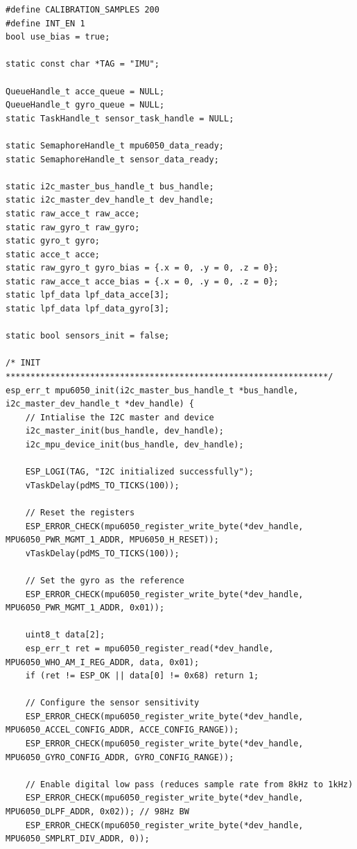 \begin{lstlisting}
#define CALIBRATION_SAMPLES 200
#define INT_EN 1
bool use_bias = true;

static const char *TAG = "IMU";

QueueHandle_t acce_queue = NULL;
QueueHandle_t gyro_queue = NULL;
static TaskHandle_t sensor_task_handle = NULL;

static SemaphoreHandle_t mpu6050_data_ready;
static SemaphoreHandle_t sensor_data_ready;

static i2c_master_bus_handle_t bus_handle;
static i2c_master_dev_handle_t dev_handle;
static raw_acce_t raw_acce; 
static raw_gyro_t raw_gyro;
static gyro_t gyro;
static acce_t acce;
static raw_gyro_t gyro_bias = {.x = 0, .y = 0, .z = 0};
static raw_acce_t acce_bias = {.x = 0, .y = 0, .z = 0};
static lpf_data lpf_data_acce[3];
static lpf_data lpf_data_gyro[3];

static bool sensors_init = false;

/* INIT *****************************************************************/
esp_err_t mpu6050_init(i2c_master_bus_handle_t *bus_handle, i2c_master_dev_handle_t *dev_handle) {
    // Intialise the I2C master and device
    i2c_master_init(bus_handle, dev_handle);
    i2c_mpu_device_init(bus_handle, dev_handle);

    ESP_LOGI(TAG, "I2C initialized successfully");
    vTaskDelay(pdMS_TO_TICKS(100)); 
    
    // Reset the registers
    ESP_ERROR_CHECK(mpu6050_register_write_byte(*dev_handle, MPU6050_PWR_MGMT_1_ADDR, MPU6050_H_RESET));
    vTaskDelay(pdMS_TO_TICKS(100)); 
    
    // Set the gyro as the reference
    ESP_ERROR_CHECK(mpu6050_register_write_byte(*dev_handle, MPU6050_PWR_MGMT_1_ADDR, 0x01));

    uint8_t data[2];
    esp_err_t ret = mpu6050_register_read(*dev_handle, MPU6050_WHO_AM_I_REG_ADDR, data, 0x01);
    if (ret != ESP_OK || data[0] != 0x68) return 1;
        
    // Configure the sensor sensitivity
    ESP_ERROR_CHECK(mpu6050_register_write_byte(*dev_handle, MPU6050_ACCEL_CONFIG_ADDR, ACCE_CONFIG_RANGE));
    ESP_ERROR_CHECK(mpu6050_register_write_byte(*dev_handle, MPU6050_GYRO_CONFIG_ADDR, GYRO_CONFIG_RANGE));

    // Enable digital low pass (reduces sample rate from 8kHz to 1kHz)
    ESP_ERROR_CHECK(mpu6050_register_write_byte(*dev_handle, MPU6050_DLPF_ADDR, 0x02)); // 98Hz BW
    ESP_ERROR_CHECK(mpu6050_register_write_byte(*dev_handle, MPU6050_SMPLRT_DIV_ADDR, 0));


\end{lstlisting}
